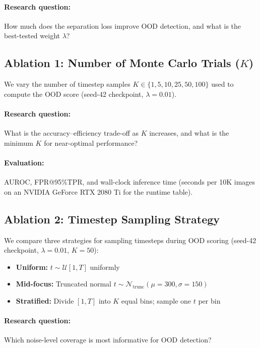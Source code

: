 \paragraph{Research question:}
How much does the separation loss improve OOD detection, and what is the
best-tested weight $\lambda$?

\subsection{Ablation 1: Number of Monte Carlo Trials ($K$)}
\label{sec:exp:design:mc-trials}

We vary the number of timestep samples
$K \in \{1, 5, 10, 25, 50, 100\}$ used to compute the OOD score
(seed-42 checkpoint, $\lambda = 0.01$).

\paragraph{Research question:}
What is the accuracy--efficiency trade-off as $K$ increases, and what is
the minimum $K$ for near-optimal performance?

\paragraph{Evaluation:}
AUROC, FPR@95\%TPR, and wall-clock inference time (seconds per 10K
images on an NVIDIA GeForce RTX 2080 Ti for the runtime table).

\subsection{Ablation 2: Timestep Sampling Strategy}
\label{sec:exp:design:timestep}

We compare three strategies for sampling timesteps during OOD scoring
(seed-42 checkpoint, $\lambda = 0.01$, $K = 50$):
\begin{itemize}
  \item \textbf{Uniform:} $t \sim \mathcal{U}[1, T]$ uniformly
  \item \textbf{Mid-focus:} Truncated normal
        $t \sim \mathcal{N}_{\mathrm{trunc}}(\mu = 300, \sigma = 150)$
  \item \textbf{Stratified:} Divide $[1, T]$ into $K$ equal bins; sample one $t$
        per bin
\end{itemize}

\paragraph{Research question:}
Which noise-level coverage is most informative for OOD detection?

